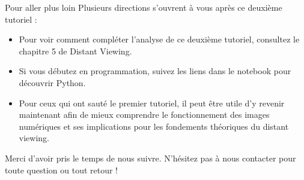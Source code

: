 \documentclass[8pt,aspectratio=169]{beamer}
\begin{document}
\begin{rightframe}{Pour aller plus loin}
  Plusieurs directions s'ouvrent à vous après ce deuxième tutoriel :

  \begin{itemize}
  \item Pour voir comment compléter l'analyse de ce deuxième tutoriel, consultez le chapitre 5 de Distant Viewing.
  \item Si vous débutez en programmation, suivez les liens dans le notebook pour découvrir Python.
  \item Pour ceux qui ont sauté le premier tutoriel, il peut être utile d'y revenir maintenant afin de mieux comprendre le fonctionnement des images numériques et ses implications pour les fondements théoriques du distant viewing.
  \end{itemize}

  Merci d'avoir pris le temps de nous suivre. N'hésitez pas à nous contacter pour toute question ou tout retour !

\end{rightframe}
\end{document}
